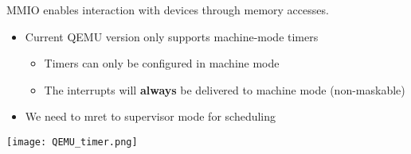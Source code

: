 \newpar{}

MMIO enables interaction with devices through memory accesses.

\newpar{}

\begin{itemize}
    \item Current QEMU version only supports machine-mode timers
          \begin{itemize}
              \item Timers can only be configured in machine mode
              \item The interrupts will \textbf{always} be delivered to machine mode (non-maskable)
          \end{itemize}
    \item We need to mret to supervisor mode for scheduling
\end{itemize}
\begin{center}
    \texttt{[image: QEMU\_timer.png]}
\end{center}

